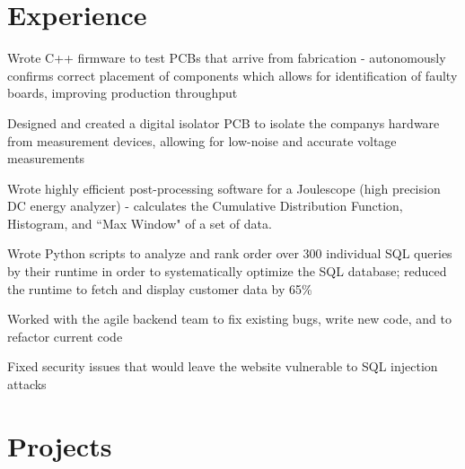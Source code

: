 \documentclass[]{deedy-resume-openfont}
\begin{document}


\section{Experience}

\begin{tightemize}
	\item Wrote C++ firmware to test PCBs that arrive from fabrication - autonomously confirms correct placement of components which allows for identification of faulty boards, improving production throughput
	\item Designed and created a digital isolator PCB to isolate the companys hardware from measurement devices, allowing for low-noise and accurate voltage measurements
	\item Wrote highly efficient post-processing software for a Joulescope (high precision DC energy analyzer) - calculates the Cumulative Distribution Function, Histogram, and ``Max Window" of a set of data.
\end{tightemize}
\vspace{8pt}

\begin{tightemize}
	\item Wrote Python scripts to analyze and rank order over 300 individual SQL queries by their runtime in order to systematically optimize the SQL database; reduced the runtime to fetch and display customer data by 65\%
	\item Worked with the agile backend team to fix existing bugs, write new code, and to refactor current code
	\item Fixed security issues that would leave the website vulnerable to SQL injection attacks
\end{tightemize}
\vspace{12pt}


\section{Projects}
\end{document}
